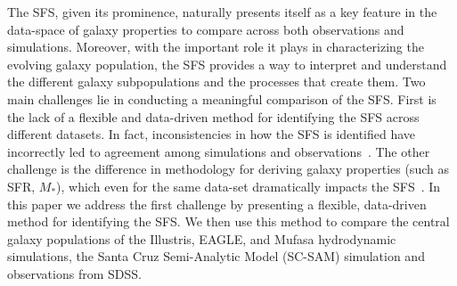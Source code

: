 \documentclass[tighten, preprint]{aastex62}
\begin{document}
The SFS, given its prominence, naturally presents itself as a key feature 
in the data-space of galaxy properties 
{\color{red} %
to compare across both observations and simulations. Moreover, with the 
important role it plays in characterizing the evolving galaxy population, 
the SFS provides a way to interpret and understand the different galaxy 
subpopulations and the processes that create them.
}
Two main challenges lie in conducting a meaningful comparison of the SFS. First 
is the lack of a flexible and data-driven method for identifying the SFS across 
different datasets. 
{\color{red} 
In fact, inconsistencies in how the SFS is identified 
have incorrectly led to agreement among simulations and 
observations~\citep[\emph{e.g.}][see Appendix~\ref{app:literature}]{somerville2015b}.
} %
The other challenge is the difference in methodology for 
deriving galaxy properties (such as SFR, $M_*$), which even for the same 
data-set dramatically impacts the SFS~\citep[\emph{e.g.}][]{speagle2014}. 
In this paper we address the first challenge by presenting a flexible, 
data-driven method for 
{\color{red}
identifying the SFS. We then} 
use this method to compare 
the central galaxy populations of the Illustris, EAGLE, and {\sc Mufasa} 
hydrodynamic simulations, the Santa Cruz Semi-Analytic Model (SC-SAM) simulation 
and observations from SDSS. 
\end{document}
